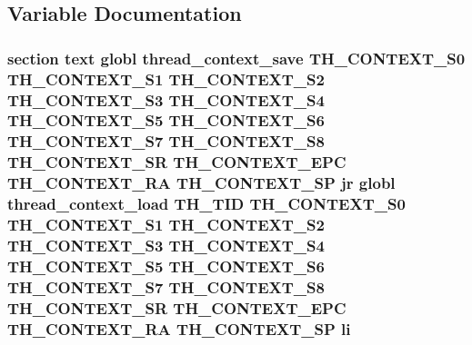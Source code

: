 \subsection{Variable Documentation}
\hypertarget{mips_2threada_8S_acbf877530fdc34fc0b39616c59070e69}{
\subsubsection[{li}]{\setlength{\rightskip}{0pt plus 5cm}section text globl {\bf thread\-\_\-context\-\_\-save} {\bf T\-H\-\_\-\-C\-O\-N\-T\-E\-X\-T\-\_\-\-S0} {\bf T\-H\-\_\-\-C\-O\-N\-T\-E\-X\-T\-\_\-\-S1} {\bf T\-H\-\_\-\-C\-O\-N\-T\-E\-X\-T\-\_\-\-S2} {\bf T\-H\-\_\-\-C\-O\-N\-T\-E\-X\-T\-\_\-\-S3} {\bf T\-H\-\_\-\-C\-O\-N\-T\-E\-X\-T\-\_\-\-S4} {\bf T\-H\-\_\-\-C\-O\-N\-T\-E\-X\-T\-\_\-\-S5} {\bf T\-H\-\_\-\-C\-O\-N\-T\-E\-X\-T\-\_\-\-S6} {\bf T\-H\-\_\-\-C\-O\-N\-T\-E\-X\-T\-\_\-\-S7} {\bf T\-H\-\_\-\-C\-O\-N\-T\-E\-X\-T\-\_\-\-S8} {\bf T\-H\-\_\-\-C\-O\-N\-T\-E\-X\-T\-\_\-\-S\-R} {\bf T\-H\-\_\-\-C\-O\-N\-T\-E\-X\-T\-\_\-\-E\-P\-C} {\bf T\-H\-\_\-\-C\-O\-N\-T\-E\-X\-T\-\_\-\-R\-A} {\bf T\-H\-\_\-\-C\-O\-N\-T\-E\-X\-T\-\_\-\-S\-P} jr globl {\bf thread\-\_\-context\-\_\-load} {\bf T\-H\-\_\-\-T\-I\-D} {\bf T\-H\-\_\-\-C\-O\-N\-T\-E\-X\-T\-\_\-\-S0} {\bf T\-H\-\_\-\-C\-O\-N\-T\-E\-X\-T\-\_\-\-S1} {\bf T\-H\-\_\-\-C\-O\-N\-T\-E\-X\-T\-\_\-\-S2} {\bf T\-H\-\_\-\-C\-O\-N\-T\-E\-X\-T\-\_\-\-S3} {\bf T\-H\-\_\-\-C\-O\-N\-T\-E\-X\-T\-\_\-\-S4} {\bf T\-H\-\_\-\-C\-O\-N\-T\-E\-X\-T\-\_\-\-S5} {\bf T\-H\-\_\-\-C\-O\-N\-T\-E\-X\-T\-\_\-\-S6} {\bf T\-H\-\_\-\-C\-O\-N\-T\-E\-X\-T\-\_\-\-S7} {\bf T\-H\-\_\-\-C\-O\-N\-T\-E\-X\-T\-\_\-\-S8} {\bf T\-H\-\_\-\-C\-O\-N\-T\-E\-X\-T\-\_\-\-S\-R} {\bf T\-H\-\_\-\-C\-O\-N\-T\-E\-X\-T\-\_\-\-E\-P\-C} {\bf T\-H\-\_\-\-C\-O\-N\-T\-E\-X\-T\-\_\-\-R\-A} {\bf T\-H\-\_\-\-C\-O\-N\-T\-E\-X\-T\-\_\-\-S\-P} li}}\label{mips_2threada_8S_acbf877530fdc34fc0b39616c59070e69}
